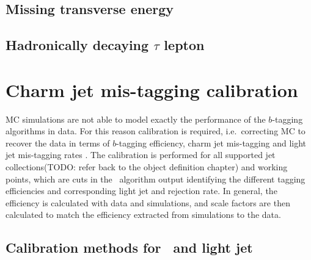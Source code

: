 \documentclass[letterpaper,12pt]{article}
\begin{document}
\subsection{Missing transverse energy}
\subsection{Hadronically decaying $\tau$ lepton}


\section{Charm jet mis-tagging calibration}
MC simulations are not able to model exactly the 
performance of the $b$-tagging algorithms in data. For this reason 
calibration is required, i.e.\ correcting MC to recover the data 
in terms of $b$-tagging efficiency, charm jet mis-tagging and 
light jet mis-tagging rates \cite{FTAG-2018-01}. The calibration is performed 
for all supported jet collections(TODO: refer back to the object definition chapter)
and working points, which are cuts in the \btagging\ 
algorithm output identifying the different tagging efficiencies 
and corresponding light jet and \cjet rejection rate.
In general, the efficiency is calculated with data and simulations, 
and scale factors are then calculated to match the efficiency extracted 
from simulations to the data.
\subsection{Calibration methods for \bjet\ and light jet}
\end{document}
